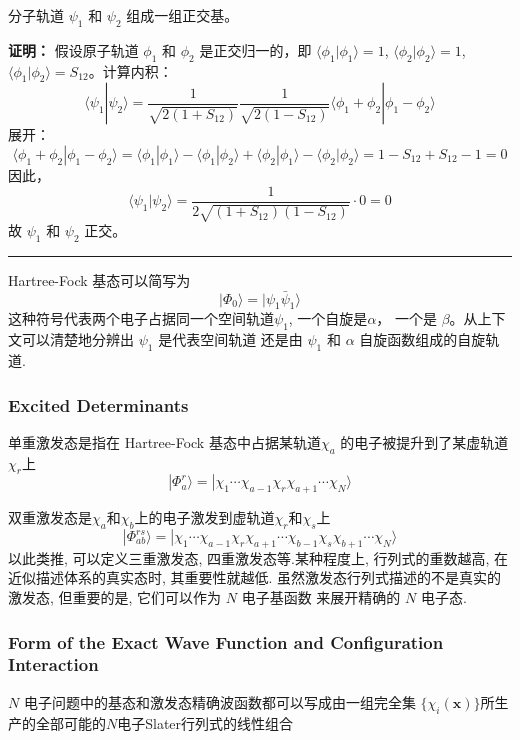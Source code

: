\documentclass[fontset=none,12pt,a4paper]{ctexart}
\numberwithin{equation}{section}
\begin{document}
分子轨道 $\psi_1$ 和 $\psi_2$ 组成一组正交基。

\textbf{证明：} 假设原子轨道 $\phi_1$ 和 $\phi_2$ 是正交归一的，即 $\langle \phi_1 | \phi_1 \rangle = 1$, $\langle \phi_2 | \phi_2 \rangle = 1$, $\langle \phi_1 | \phi_2 \rangle = S_{12}$。计算内积：
\[
\langle \psi_1 | \psi_2 \rangle = \frac{1}{\sqrt{2(1+S_{12})}} \frac{1}{\sqrt{2(1-S_{12})}} \langle \phi_1 + \phi_2 | \phi_1 - \phi_2 \rangle
\]
展开：
\[
\langle \phi_1 + \phi_2 | \phi_1 - \phi_2 \rangle = \langle \phi_1 | \phi_1 \rangle - \langle \phi_1 | \phi_2 \rangle + \langle \phi_2 | \phi_1 \rangle - \langle \phi_2 | \phi_2 \rangle = 1 - S_{12} + S_{12} - 1 = 0
\]
因此，
\[
\langle \psi_1 | \psi_2 \rangle = \frac{1}{2 \sqrt{(1+S_{12})(1-S_{12})}} \cdot 0 = 0
\]
故 $\psi_1$ 和 $\psi_2$ 正交。

\noindent\rule{\linewidth}{0.4pt}
\vspace{1em}

Hartree-Fock 基态可以简写为
\begin{equation}
  |\Phi_0\rangle = |\psi_1 \bar{\psi}_1 \rangle
\end{equation}
这种符号代表两个电子占据同一个空间轨道$\psi_1$, 一个自旋是$\alpha$，
一个是 $\beta$。从上下文可以清楚地分辨出 $\psi_1$ 是代表空间轨道
还是由 $\psi_1$ 和 $\alpha$ 自旋函数组成的自旋轨道.
\subsubsection{Excited Determinants}
单重激发态是指在 Hartree-Fock 基态中占据某轨道$\chi_a$
的电子被提升到了某虚轨道$\chi_r$上
\begin{equation}
  |\Phi_a^r\rangle = |\chi_1 \cdots \chi_{a-1} \chi_r \chi_{a+1} \cdots \chi_N \rangle
\end{equation}

双重激发态是$\chi_a$和$\chi_b$上的电子激发到虚轨道$\chi_r$和$\chi_s$上
\begin{equation}
  |\Phi_{ab}^{rs}\rangle = |\chi_1 \cdots \chi_{a-1} \chi_r \chi_{a+1} \cdots \chi_{b-1} \chi_s \chi_{b+1} \cdots \chi_N \rangle
\end{equation}
以此类推, 可以定义三重激发态, 四重激发态等.某种程度上, 行列式的重数越高,
在近似描述体系的真实态时, 其重要性就越低. 
虽然激发态行列式描述的不是真实的激发态, 但重要的是, 它们可以作为 $N$ 电子基函数
来展开精确的 $N$ 电子态.
\subsubsection{Form of the Exact Wave Function and 
Configuration Interaction}
$N$ 电子问题中的基态和激发态精确波函数都可以写成由一组完全集
$\{\chi_i(\mathbf{x})\}$所生产的全部可能的$N$电子Slater行列式的线性组合
\end{document}
